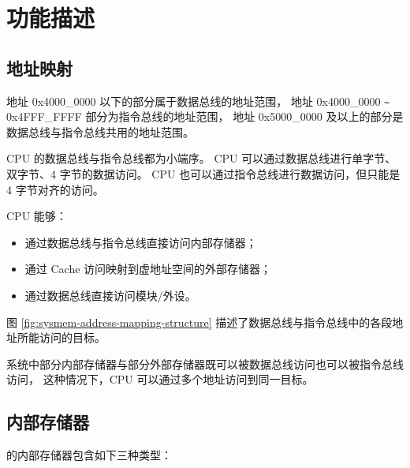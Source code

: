 \documentclass[main\_\_CN.tex]{subfiles}
\begin{document}
\section{功能描述}

\subsection{地址映射}

地址 0x4000\_0000 以下的部分属于数据总线的地址范围，
地址 0x4000\_0000 \verb+~+ 0x4FFF\_FFFF 部分为指令总线的地址范围，
地址 0x5000\_0000 及以上的部分是数据总线与指令总线共用的地址范围。

CPU 的数据总线与指令总线都为小端序。
CPU 可以通过数据总线进行单字节、双字节、4 字节的数据访问。
CPU 也可以通过指令总线进行数据访问，但只能是 4 字节对齐的访问。

CPU 能够：
\begin{itemize}
\item 通过数据总线与指令总线直接访问内部存储器；
\item 通过 Cache 访问映射到虚地址空间的外部存储器；
\item 通过数据总线直接访问模块/外设。
\end{itemize}

图 \ref{fig:sysmem-address-mapping-structure}    描述了数据总线与指令总线中的各段地址所能访问的目标。

系统中部分内部存储器与部分外部存储器既可以被数据总线访问也可以被指令总线访问，
这种情况下，CPU 可以通过多个地址访问到同一目标。


\subsection{内部存储器}
\label{para:sysmem-internal-memory}

\chipname{} 的内部存储器包含如下三种类型：
\end{document}

